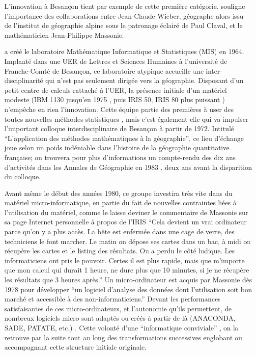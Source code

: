 L'innovation à Besançon tient par exemple de cette première catégorie. \textcite[131]{Cuyala2014} souligne l’importance des collaborations entre Jean-Claude Wieber, géographe alors issu de l’institut de géographie alpine sous le patronage éclairé de Paul Claval, et le mathématicien Jean-Philippe Massonie.

\textcite{Massonie1986} a créé le laboratoire Mathématique Informatique et Statistiques (MIS) en 1964. Implanté dans une UER de Lettres et Sciences Humaines à l’université de Franche-Comté de Besançon, ce laboratoire atypique accueille une inter-disciplinarité qui n'est pas seulement dirigée vers la géographie. Disposant d’un petit centre de calculs rattaché à l'UER, la présence initiale d'un matériel modeste (IBM 1130 jusqu'en 1975 \autocite[22]{Wieber1980}, puis IRIS 50, IRIS 80 plus puissant \autocite{Massonie1986}) n'empêche en rien l'innovation. Cette équipe partie des premières à user des toutes nouvelles méthodes statistiques \autocite{Massonie1971}, mais c'est également elle qui va impulser l'important colloque interdisciplinaire de Besançon à partir de 1972. Intitulé \enquote{L'application des méthodes mathématiques à la géographie}, ce lieu d'échange joue selon \autocite[331]{Cuyala2014} un poids indéniable dans l'histoire de la géographie quantitative française; on trouvera pour plus d'informations un compte-rendu des dix ans d'activités dans les Annales de Géographie en 1983 \autocite{Massonie1983}, deux ans avant la disparition du colloque.

Avant même le début des années 1980, ce groupe investira très vite dans du matériel micro-informatique, en partie du fait de nouvelles contraintes liées à l'utilisation du matériel, comme le laisse deviner le commentaire de Massonie sur sa page Internet personnelle à propos de l'IRIS \enquote{Cela devient un vrai ordinateur parce qu'on y a plus accès. La bête est enfermée dans une cage de verre, des techniciens le font marcher. Le matin on dépose ses cartes dans un bac, à midi on récupère les cartes et le listing des résultats. On a perdu le côté ludique. Les informaticiens ont pris le pouvoir. Certes il est plus rapide, mais que m'importe que mon calcul qui durait 1 heure, ne dure plus que 10 minutes, si je ne récupère les résultats que 3 heures après.} Un micro-ordinateur est acquis par Massonie dès 1978 pour développer \enquote{un logiciel d'analyse des données dont l'utilisation soit bon marché et accessible à des non-informaticiens.} Devant les performances satisfaisantes de ces micro-ordinateurs, et l'autonomie qu'ils permettent, de nombreux logiciels micro sont adaptés ou créés à partir de là (ANACONDA, SADE, PATATE, etc.) \autocite{Massonie1986}. Cette volonté d'une \enquote{informatique conviviale} \autocite{TSH1984}, on la retrouve par la suite tout au long des transformations successives englobant ou accompagnant cette structure initiale originale.

